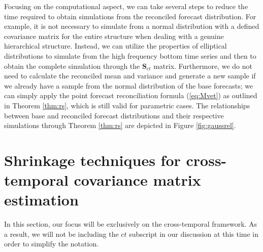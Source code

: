 \documentclass[a4paper,11pt]{article}
\newcommand{\Svet}{\bm{S}}
\theoremstyle{definition}
\begin{document}
Focusing on the computational aspect, we can take several steps to reduce the time required to obtain simulations from the reconciled forecast distribution. For example, it is not necessary to simulate from a normal distribution with a defined covariance matrix for the entire structure when dealing with a genuine hierarchical structure. Instead, we can utilize the properties of elliptical distributions to simulate from the high frequency bottom time series and then to obtain the complete simulation through the $\Svet_{ct}$ matrix. Furthermore, we do not need to calculate the reconciled mean and variance and generate a new sample if we already have a sample from the normal distribution of the base forecasts; we can simply apply the point forecast reconciliation formula (\ref{eq:Mvet}) as outlined in Theorem \ref{thm:rs}, which is still valid for parametric cases. The relationships between base and reconciled forecast distributions and their respective simulations through Theorem \ref{thm:rs} are depicted in Figure \ref{fig:gaussrel}.



\section{Shrinkage techniques for cross-temporal covariance matrix estimation}\label{sec:shrtech}
In this section, our focus will be exclusively on the cross-temporal framework. As a result, we will not be including the $ct$ subscript in our discussion at this time in order to simplify the notation.
\end{document}
